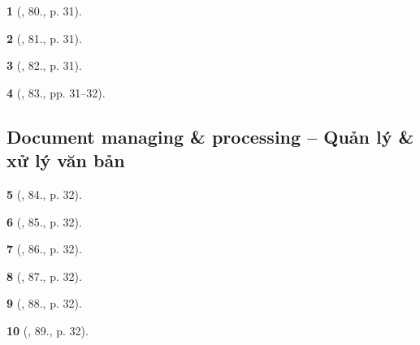 \documentclass{article}
\newtheorem{baitoan}{}
\begin{document}
\begin{baitoan}[\cite{Doanh_Tuan_Pascal}, 80., p. 31]
	
\end{baitoan}

\begin{baitoan}[\cite{Doanh_Tuan_Pascal}, 81., p. 31]
	
\end{baitoan}

\begin{baitoan}[\cite{Doanh_Tuan_Pascal}, 82., p. 31]
	
\end{baitoan}

\begin{baitoan}[\cite{Doanh_Tuan_Pascal}, 83., pp. 31--32]
	
\end{baitoan}


\subsection{Document managing \& processing -- Quản lý \& xử lý văn bản}

\begin{baitoan}[\cite{Doanh_Tuan_Pascal}, 84., p. 32]
	
\end{baitoan}

\begin{baitoan}[\cite{Doanh_Tuan_Pascal}, 85., p. 32]
	
\end{baitoan}

\begin{baitoan}[\cite{Doanh_Tuan_Pascal}, 86., p. 32]
	
\end{baitoan}

\begin{baitoan}[\cite{Doanh_Tuan_Pascal}, 87., p. 32]
	
\end{baitoan}

\begin{baitoan}[\cite{Doanh_Tuan_Pascal}, 88., p. 32]
	
\end{baitoan}

\begin{baitoan}[\cite{Doanh_Tuan_Pascal}, 89., p. 32]
	
\end{baitoan}
\end{document}
